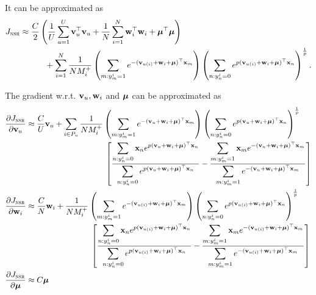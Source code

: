 It can be approximated as
\begin{equation*}
\begin{aligned}
J_\textsc{nsr} 
&\approx \frac{C}{2} \left( \frac{1}{U} \sum_{u=1}^U \mathbf{v}_u^\top \mathbf{v}_u + \frac{1}{N} \sum_{i=1}^N \mathbf{w}_i^\top \mathbf{w}_i + \bm{\mu}^\top \bm{\mu} \right) \\
& \hspace{3em}
  + \sum_{i=1}^N \frac{1}{N M_i^+} 
    \left( \sum_{m: y_m^i = 1} e^{-(\mathbf{v}_{u(i)} + \mathbf{w}_i + \bm{\mu})^\top \mathbf{x}_m} \right)
    \left( \sum_{n: y_n^i = 0} e^{p (\mathbf{v}_{u(i)} + \mathbf{w}_i + \bm{\mu})^\top \mathbf{x}_n} \right)^\frac{1}{p}.
\end{aligned}
\end{equation*}

The gradient w.r.t. $\mathbf{v}_u, \mathbf{w}_i$ and $\bm{\mu}$ can be approximated as 
\begin{equation*}
\begin{aligned}
\frac{\partial J_\textsc{nsr}}{\partial \bv_u}
&\approx \frac{C}{U} \bv_u
  + \sum_{i \in P_u} \frac{1}{N M_i^+} 
    \left( \sum_{m: y_m^i = 1} e^{-(\bv_u + \w_i + \mubm)^\top \x_m} \right)
    \left( \sum_{n: y_n^i = 0} e^{p (\bv_u + \w_i + \mubm)^\top \x_n} \right)^\frac{1}{p} \\
& \hspace{9.8em} \left[ 
    \frac{ \displaystyle \sum_{n: y_n^i = 0} \x_n e^{p (\bv_u + \w_i + \mubm)^\top \x_n} }
         { \displaystyle \sum_{n: y_n^i = 0} e^{p (\bv_u + \w_i + \mubm)^\top \x_n} }
    - \frac{ \displaystyle \sum_{m: y_m^i = 1} \x_m e^{-(\bv_u + \w_i + \mubm)^\top \x_m} }
           { \displaystyle \sum_{m: y_m^i = 1} e^{-(\bv_u + \w_i + \mubm)^\top \x_m} } \right] \\
%
\frac{\partial J_\textsc{nsr}}{\partial \w_i}
&\approx \frac{C}{N} \w_i
  + \frac{1}{N M_i^+} 
    \left( \sum_{m: y_m^i = 1} e^{-(\bv_{u(i)} + \w_i + \mubm)^\top \x_m} \right)
    \left( \sum_{n: y_n^i = 0} e^{p (\bv_{u(i)} + \w_i + \mubm)^\top \x_n} \right)^\frac{1}{p} \\
& \hspace{8em} \left[ 
    \frac{ \displaystyle \sum_{n: y_n^i = 0} \x_n e^{p (\bv_{u(i)} + \w_i + \mubm)^\top \x_n} }
         { \displaystyle \sum_{n: y_n^i = 0} e^{p (\bv_{u(i)} + \w_i + \mubm)^\top \x_n} }
    - \frac{ \displaystyle \sum_{m: y_m^i = 1} \x_m e^{-(\bv_{u(i)} + \w_i + \mubm)^\top \x_m} }
           { \displaystyle \sum_{m: y_m^i = 1} e^{-(\bv_{u(i)} + \w_i + \mubm)^\top \x_m} } \right] \\
%
\frac{\partial J_\textsc{nsr}}{\partial \mubm}
&\approx C \mubm

\end{aligned}
\end{equation*}
